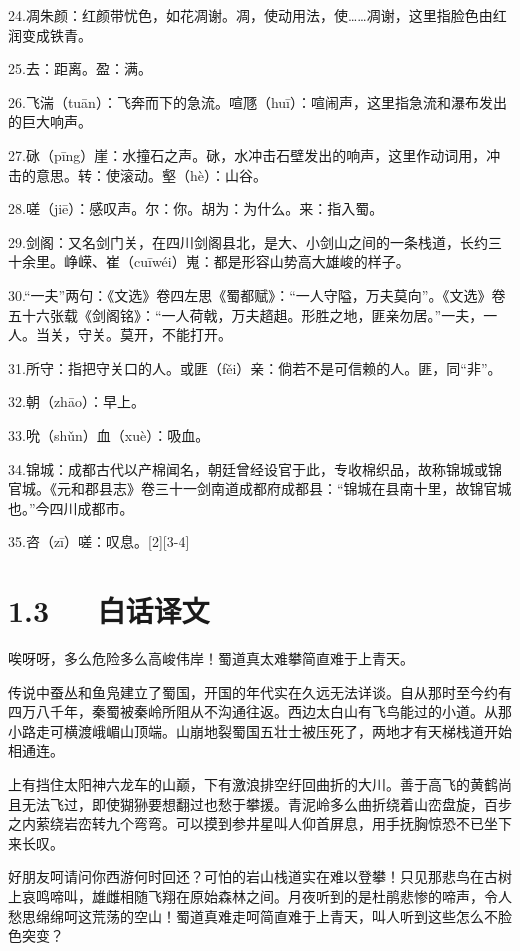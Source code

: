 \documentclass[letterpaper,10pt,english]{sphinxmanual}
\begin{document}
24.凋朱颜：红颜带忧色，如花凋谢。凋，使动用法，使……凋谢，这里指脸色由红润变成铁青。

25.去：距离。盈：满。

26.飞湍（tuān）：飞奔而下的急流。喧豗（huī）：喧闹声，这里指急流和瀑布发出的巨大响声。

27.砯（pīng）崖：水撞石之声。砯，水冲击石壁发出的响声，这里作动词用，冲击的意思。转：使滚动。壑（hè）：山谷。

28.嗟（jiē）：感叹声。尔：你。胡为：为什么。来：指入蜀。

29.剑阁：又名剑门关，在四川剑阁县北，是大、小剑山之间的一条栈道，长约三十余里。峥嵘、崔（cuīwéi）嵬：都是形容山势高大雄峻的样子。

30.“一夫”两句：《文选》卷四左思《蜀都赋》：“一人守隘，万夫莫向”。《文选》卷五十六张载《剑阁铭》：“一人荷戟，万夫趦趄。形胜之地，匪亲勿居。”一夫，一人。当关，守关。莫开，不能打开。

31.所守：指把守关口的人。或匪（fěi）亲：倘若不是可信赖的人。匪，同“非”。

32.朝（zhāo）：早上。

33.吮（shǔn）血（xuè）：吸血。

34.锦城：成都古代以产棉闻名，朝廷曾经设官于此，专收棉织品，故称锦城或锦官城。《元和郡县志》卷三十一剑南道成都府成都县：“锦城在县南十里，故锦官城也。”今四川成都市。

35.咨（zī）嗟：叹息。{[}2{]}{[}3-4{]}


\section{1.3   白话译文}
\label{\detokenize{p01_u6563_u6587/_u674e_u767d-_u8700_u9053_u96be:id5}}
唉呀呀，多么危险多么高峻伟岸！蜀道真太难攀简直难于上青天。

传说中蚕丛和鱼凫建立了蜀国，开国的年代实在久远无法详谈。自从那时至今约有四万八千年，秦蜀被秦岭所阻从不沟通往返。西边太白山有飞鸟能过的小道。从那小路走可横渡峨嵋山顶端。山崩地裂蜀国五壮士被压死了，两地才有天梯栈道开始相通连。

上有挡住太阳神六龙车的山巅，下有激浪排空纡回曲折的大川。善于高飞的黄鹤尚且无法飞过，即使猢狲要想翻过也愁于攀援。青泥岭多么曲折绕着山峦盘旋，百步之内萦绕岩峦转九个弯弯。可以摸到参井星叫人仰首屏息，用手抚胸惊恐不已坐下来长叹。

好朋友呵请问你西游何时回还？可怕的岩山栈道实在难以登攀！只见那悲鸟在古树上哀鸣啼叫，雄雌相随飞翔在原始森林之间。月夜听到的是杜鹃悲惨的啼声，令人愁思绵绵呵这荒荡的空山！蜀道真难走呵简直难于上青天，叫人听到这些怎么不脸色突变？
\end{document}
